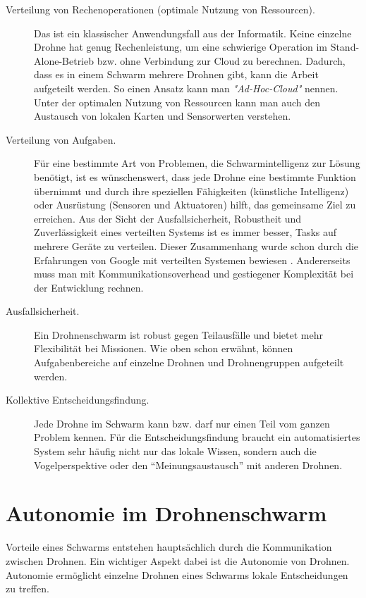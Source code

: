 \begin{description} 
	\item[Verteilung von Rechenoperationen (optimale Nutzung von Ressourcen).] Das ist ein klassischer Anwendungsfall aus der Informatik. Keine einzelne Drohne hat genug Rechenleistung, um eine schwierige Operation im Stand-Alone-Betrieb bzw. ohne Verbindung zur Cloud zu berechnen. Dadurch, dass es in einem Schwarm mehrere Drohnen gibt, kann die Arbeit aufgeteilt werden. So einen Ansatz kann man \textit{"Ad-Hoc-Cloud"} nennen. Unter der optimalen Nutzung von Ressourcen kann man auch den Austausch von lokalen Karten und Sensorwerten verstehen.
	
	\item[Verteilung von Aufgaben.] Für eine bestimmte Art von Problemen, die Schwarmintelligenz zur Lösung benötigt, ist es wünschenswert, dass jede Drohne eine bestimmte Funktion übernimmt und durch ihre speziellen Fähigkeiten (künstliche Intelligenz) oder Ausrüstung (Sensoren und Aktuatoren) hilft, das gemeinsame Ziel zu erreichen.
	Aus der Sicht der Ausfallsicherheit, Robustheit und Zuverlässigkeit eines verteilten Systems ist es immer besser, Tasks auf mehrere Geräte zu verteilen.  Dieser Zusammenhang wurde schon durch die Erfahrungen von Google mit verteilten Systemen bewiesen \cite{chubby}. Andererseits muss man mit Kommunikationsoverhead und gestiegener Komplexität bei der Entwicklung rechnen.
	
	\item[Ausfallsicherheit.] Ein Drohnenschwarm ist robust gegen Teilausfälle und bietet mehr Flexibilität bei Missionen. Wie oben schon erwähnt, können Aufgabenbereiche auf einzelne Drohnen und Drohnengruppen aufgeteilt werden.
	
	\item[Kollektive Entscheidungsfindung.]	Jede Drohne im Schwarm kann bzw. darf nur einen Teil vom ganzen Problem kennen. Für die Entscheidungsfindung braucht ein automatisiertes System sehr häufig nicht nur das lokale Wissen, sondern auch die Vogelperspektive oder den “Meinungsaustausch” mit anderen Drohnen.
\end{description}

\section{Autonomie im Drohnenschwarm}
\label{cha:swarmAutonomy}

Vorteile eines Schwarms entstehen hauptsächlich durch die Kommunikation zwischen Drohnen. Ein wichtiger Aspekt dabei ist die Autonomie von Drohnen. Autonomie ermöglicht einzelne Drohnen eines Schwarms lokale Entscheidungen zu treffen. 

